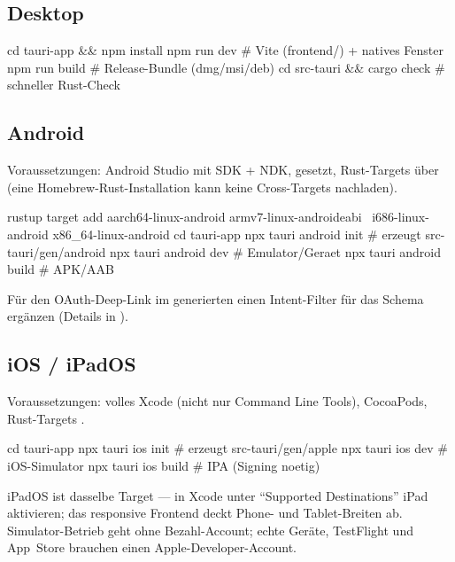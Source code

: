 \subsection{Desktop}

\begin{syntaxbox}[bash]
cd tauri-app && npm install
npm run dev                   # Vite (frontend/) + natives Fenster
npm run build                 # Release-Bundle (dmg/msi/deb)
cd src-tauri && cargo check   # schneller Rust-Check
\end{syntaxbox}

\subsection{Android}

Voraussetzungen: Android Studio mit SDK + NDK,  gesetzt,
Rust-Targets über  (eine Homebrew-Rust-Installation kann keine
Cross-Targets nachladen).

\begin{syntaxbox}[bash]
rustup target add aarch64-linux-android armv7-linux-androideabi \
  i686-linux-android x86_64-linux-android
cd tauri-app
npx tauri android init    # erzeugt src-tauri/gen/android
npx tauri android dev     # Emulator/Geraet
npx tauri android build   # APK/AAB
\end{syntaxbox}

Für den OAuth-Deep-Link im generierten
 einen Intent-Filter für das Schema
 ergänzen (Details in ).

\subsection{iOS / iPadOS}

Voraussetzungen: volles Xcode (nicht nur Command Line Tools), CocoaPods,
Rust-Targets \icode{aarch64-apple-ios(-sim)}.

\begin{syntaxbox}[bash]
cd tauri-app
npx tauri ios init        # erzeugt src-tauri/gen/apple
npx tauri ios dev         # iOS-Simulator
npx tauri ios build       # IPA (Signing noetig)
\end{syntaxbox}

\begin{infobox}[iPadOS]
  iPadOS ist dasselbe Target — in Xcode unter \enquote{Supported Destinations}
  iPad aktivieren; das responsive Frontend deckt Phone- und Tablet-Breiten ab.
  Simulator-Betrieb geht ohne Bezahl-Account; echte Geräte, TestFlight und
  App~Store brauchen einen Apple-Developer-Account.
\end{infobox}

